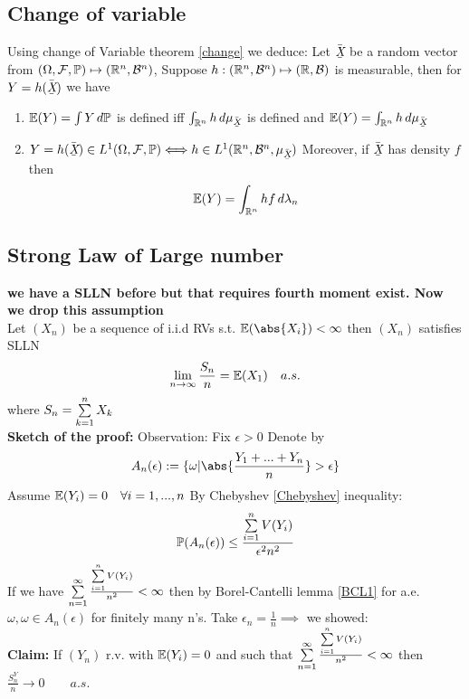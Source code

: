 \subsection{Change of variable}
Using change of Variable theorem \ref{change} we deduce:
Let $\doublebar{X}$ be a random vector from $(\Omega, \mathcal{F}, \mathbb{P}) \mapsto (\mathbb{R}^n, \mathcal{B}^n)$, Suppose $h:(\mathbb{R}^n, \mathcal{B}^n) \mapsto (\mathbb{R}, \mathcal{B}) $ is measurable, then for $Y = h(\doublebar{X})$ we have 
\begin{enumerate}
    \item $\mathbb{E}(Y) = \int Y \mathop{}\!d \mathbb{P}$ is defined iff $\int_{\R^n} h \diff\mu_{\doublebar{X}}$ is defined and $\E(Y) = \int_{\R^n} h \diff\mu_{\doublebar{X}}$
    \item $Y = h(\doublebar{X}) \in \ls{1}(\Omega, \F, \prob) \Longleftrightarrow h\in \ls{1}(\R^n, \B^n, \mu_{\doublebar{X}})$ Moreover, if $\doublebar{X}$ has density $f$ then 
    \begin{equation*}
        \mathbb{E}(Y) = \int_{\mathbb{R}^n} hf \mathop{}\!d\lambda_n
    \end{equation*}
\end{enumerate}
\subsection{Strong Law of Large number}
\textbf{we have a SLLN before but that requires fourth moment exist. Now we drop this assumption} \\ 
Let $(X_n)$ be a sequence of i.i.d RVs s.t. $\E(\abs{X_i}) < \infty$ then $(X_n)$ satisfies SLLN
\begin{equation*}
    \lim\limits_{n\rightarrow \infty} \frac{S_n}{n} = \mathbb{E}(X_1) \quad a.s.
\end{equation*}where $S_n = \sum\limits_{k=1}^n X_k$ \\
\pf 
\textbf{Sketch of the proof:} Observation: Fix $\epsilon > 0$ Denote by \begin{equation*}
    A_n(\epsilon) := \{\omega|\abs{\frac{Y_1+...+Y_n}{n}} > \epsilon\}
\end{equation*}Assume $\mathbb{E}(Y_i) = 0 \quad \forall i = 1,...,n$ By Chebyshev \ref{Chebyshev} inequality:
\begin{equation*}
    \mathbb{P}(A_n(\epsilon)) \leq \frac{\sum\limits_{i=1}^n V(Y_i)}{\epsilon^2 n^2}
\end{equation*}If we have $\sum\limits_{n=1}^\infty \frac{\sum\limits_{i=1}^n V(Y_i)}{n^2} < \infty$ then by Borel-Cantelli lemma \ref{BCL1} for a.e. $\omega, \omega \in A_n(\epsilon)$ for finitely many n's. Take $\epsilon_n = \frac{1}{n} \implies$ we showed: \\
\textbf{Claim:} If $(Y_n)$ r.v. with $\mathbb{E}(Y_i) = 0$ and such that $\sum\limits_{n=1}^\infty \frac{\sum\limits_{i=1}^n V(Y_i)}{n^2} < \infty$ then $\frac{S_n^Y}{n} \rightarrow 0 \qquad a.s.$

